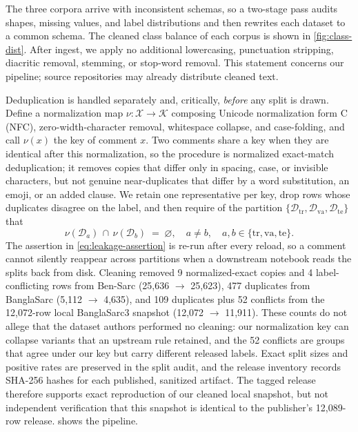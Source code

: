\documentclass{ieeeaccess}
\newcommand{\dset}[1]{#1}
\begin{document}
The three corpora arrive with inconsistent schemas, so a two-stage pass audits shapes, missing values, and label distributions and then rewrites each dataset to a common schema. The cleaned class balance of each corpus is shown in \cref{fig:class-dist}. After ingest, we apply no additional lowercasing, punctuation stripping, diacritic removal, stemming, or stop-word removal. This statement concerns our pipeline; source repositories may already distribute cleaned text.

Deduplication is handled separately and, critically, \emph{before} any split is drawn. Define a normalization map $\nu:\mathcal{X}\to\mathcal{K}$ composing Unicode normalization form C (NFC), zero-width-character removal, whitespace collapse, and case-folding, and call $\nu(x)$ the key of comment $x$. Two comments share a key when they are identical after this normalization, so the procedure is normalized exact-match deduplication; it removes copies that differ only in spacing, case, or invisible characters, but not genuine near-duplicates that differ by a word substitution, an emoji, or an added clause. We retain one representative per key, drop rows whose duplicates disagree on the label, and then require of the partition $\{\mathcal{D}_{\mathrm{tr}},\mathcal{D}_{\mathrm{va}},\mathcal{D}_{\mathrm{te}}\}$ that
\begin{equation}
\nu(\mathcal{D}_{a})\,\cap\,\nu(\mathcal{D}_{b}) \;=\; \varnothing,
\quad a \neq b, \quad a,b \in \{\mathrm{tr},\mathrm{va},\mathrm{te}\}.
\label{eq:leakage-assertion}
\end{equation}
The assertion in \cref{eq:leakage-assertion} is re-run after every reload, so a comment cannot silently reappear across partitions when a downstream notebook reads the splits back from disk. Cleaning removed 9 normalized-exact copies and 4 label-conflicting rows from \dset{Ben-Sarc} (25{,}636 $\rightarrow$ 25{,}623), 477 duplicates from \dset{BanglaSarc} (5{,}112 $\rightarrow$ 4{,}635), and 109 duplicates plus 52 conflicts from the 12{,}072-row local \dset{BanglaSarc3} snapshot (12{,}072 $\rightarrow$ 11{,}911). These counts do not allege that the dataset authors performed no cleaning: our normalization key can collapse variants that an upstream rule retained, and the 52 conflicts are groups that agree under our key but carry different released labels. Exact split sizes and positive rates are preserved in the split audit, and the release inventory records SHA-256 hashes for each published,
sanitized artifact. The tagged release therefore supports exact reproduction of our cleaned local snapshot, but not independent verification that this snapshot is identical to the publisher's 12,089-row release. shows the pipeline.
\end{document}
